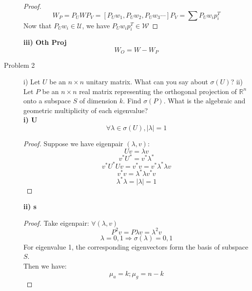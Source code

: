 \documentclass{article}
\begin{document}
\begin{description}
\begin{proof}
			$$ W_P = P_UWP_V = [P_Uw_1, P_Uw_2, P_Uw_3 \cdots]P_V = \sum P_Uw_ip_i^T $$
			Now that $P_Uw_i \in \mathcal{U}$, we have $P_Uw_ip_i^T \in \mathcal{W}$ 
		\end{proof}
	\textbf{iii) Oth Proj}
		$$W_O = W - W_P$$

	\item[Problem 2] i) Let $U$ be an $n \times n$ unitary matrix. What can you say about $\sigma(U)$? ii) Let $P$ be an $n \times n$ real matrix representing the orthogonal projection of $\mathbb{R}^{n}$ onto a subspace $S$ of dimension $k$. Find $\sigma(P)$. What is the algebraic and geometric multiplicity of each eigenvalue? \\
	\textbf{i) U}
	$$\forall \lambda \in \sigma(U), |\lambda| = 1$$
	\begin{proof}
		Suppose we have eigenpair $(\lambda, v)$:
		$$ Uv = \lambda v$$
		$$ v^*U^* = v^*\lambda^*$$
		$$ v^*U^* Uv = v^*v = v^*\lambda^*\lambda v$$
		$$ v^*v = \lambda^*\lambda v^*v$$
		$$ \lambda^*\lambda = |\lambda| = 1$$
	\end{proof}
	\textbf{ii) s}
	\begin{proof}
		Take eigenpair: $\forall (\lambda, v)$
		$$P^2v = P\lambda v = \lambda^2 v$$
		$$ \lambda = 0, 1 \Rightarrow \sigma(\lambda) = {0, 1}$$
		For eigenvalue 1, the corresponding eigenvectors form the basis of subspace $S$.\\
		Then we have:
		$$ \mu_a = k; \mu_g = n - k$$
	\end{proof}

\end{description}
\end{document}
